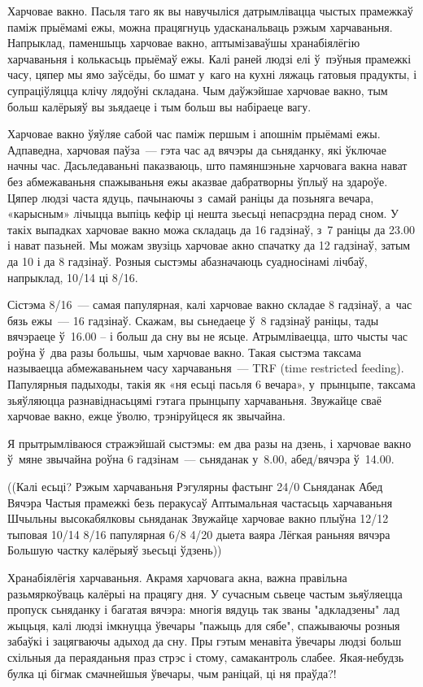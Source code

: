 Харчовае вакно. Пасьля таго як вы навучыліся датрымлівацца чыстых прамежкаў паміж прыёмамі ежы, можна працягнуць удасканальваць рэжым харчаваньня. Напрыклад, паменшыць харчовае вакно, аптымізаваўшы хранабіялёгію харчаваньня і колькасьць прыёмаў ежы. Калі раней людзі елі ў~пэўныя прамежкі часу, цяпер мы ямо заўсёды, бо шмат у~каго на кухні ляжаць гатовыя прадукты, і супраціўляцца клічу лядоўні складана. Чым даўжэйшае харчовае вакно, тым больш калёрыяў вы зьядаеце і тым больш вы набіраеце вагу.

Харчовае вакно ўяўляе сабой час паміж першым і апошнім прыёмамі ежы. Адпаведна, харчовая паўза~--- гэта час ад вячэры да сьняданку, які ўключае начны час. Дасьледаваньні паказваюць, што памяншэньне харчовага вакна нават без абмежаваньня спажываньня ежы аказвае дабратворны ўплыў на здароўе. Цяпер людзі часта ядуць, пачынаючы з~самай раніцы да позьняга вечара, «карысным» лічыцца выпіць кефір ці нешта зьесьці непасрэдна перад сном. У такіх выпадках харчовае вакно можа складаць да 16 гадзінаў, з~7 раніцы да 23.00 і нават пазьней. Мы можам звузіць харчовае акно спачатку да 12 гадзінаў, затым да 10 і да 8 гадзінаў. Розныя сыстэмы абазначаюць суадносінамі лічбаў, напрыклад, 10/14 ці 8/16.

Сістэма 8/16~--- самая папулярная, калі харчовае вакно складае 8 гадзінаў, а~час бязь ежы~--- 16 гадзінаў. Скажам, вы сьнедаеце ў~8 гадзінаў раніцы, тады вячэраеце ў~16.00 -- і больш да сну вы не ясьце. Атрымліваецца, што чысты час роўна ў~два разы большы, чым харчовае вакно. Такая сыстэма таксама называецца абмежаваньнем часу харчаваньня~--- TRF (time restricted feeding). Папулярныя падыходы, такія як «ня есьці пасьля 6 вечара», у~прынцыпе, таксама зьяўляюцца разнавіднасьцямі гэтага прынцыпу харчаваньня. Звужайце сваё харчовае вакно, ежце ўволю, трэніруйцеся як звычайна.

Я прытрымліваюся стражэйшай сыстэмы: ем два разы на дзень, і харчовае вакно ў~мяне звычайна роўна 6 гадзінам~--- сьняданак у~8.00, абед/вячэра ў~14.00.

((Калі есьці? Рэжым харчаваньня Рэгулярны фастынг 24/0 Сьняданак Абед Вячэра Частыя прамежкі безь перакусаў Аптымальная частасьць харчаваньня Шчыльны высокабялковы сьняданак Звужайце харчовае вакно плыўна 12/12 тыповая 10/14 8/16 папулярная 6/8 4/20 дыета ваяра Лёгкая раньняя вячэра Большую частку калёрыяў зьесьці ўдзень))

Хранабіялёгія харчаваньня. Акрамя харчовага акна, важна правільна разьмяркоўваць калёрыі на працягу дня. У сучасным сьвеце частым зьяўляецца пропуск сьняданку і багатая вячэра: многія вядуць так званы "адкладзены" лад жыцьця, калі людзі імкнуцца ўвечары "пажыць для сябе", спажываючы розныя забаўкі і зацягваючы адыход да сну. Пры гэтым менавіта ўвечары людзі больш схільныя да пераяданьня праз стрэс і стому, самакантроль слабее. Якая-небудзь булка ці бігмак смачнейшыя ўвечары, чым раніцай, ці ня праўда?!

